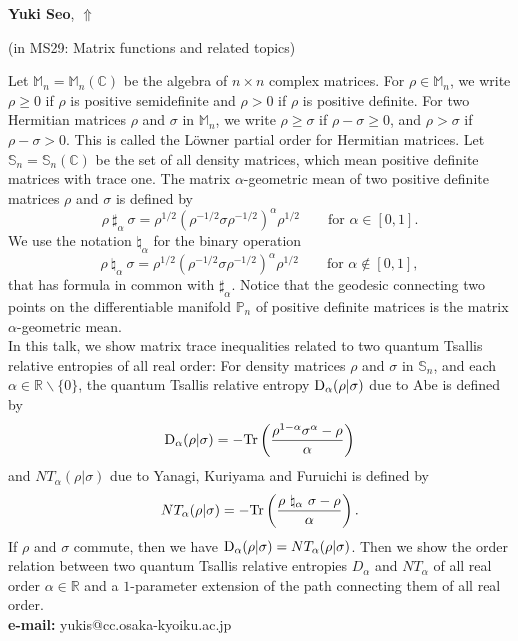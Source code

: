 \documentclass[ILAS2025-program.tex]{subfiles}
\begin{document}
\hypertarget{down0157}{}\begin{ilasabstract}
    
\textbf{Yuki Seo},  \hfill \hyperlink{up0157}{$\Uparrow$}
    
    
(in {\color{mstitle}MS29: Matrix functions and related topics})
        
\mtskip
    Let ${\mathbb M}_n = {\mathbb M}_n({\mathbb C})$ be the algebra of $n\times n$ complex matrices. For $\rho \in {\mathbb M}_n$, we write $\rho \geq 0$ if $\rho$ is positive semidefinite and $\rho >0$ if $\rho$ is positive definite. For two Hermitian matrices $\rho$ and $\sigma$ in ${\mathbb M}_n$, we write $\rho \geq \sigma$ if $\rho - \sigma \geq 0$, and $\rho > \sigma$ if $\rho - \sigma >0$. This is called the L\"{o}wner partial order for Hermitian matrices. Let ${\mathbb S}_n = {\mathbb S}_n({\mathbb C})$ be the set of all density matrices, which mean  positive definite matrices with trace one. The matrix $\alpha$-geometric mean of two positive definite matrices $\rho$ and $\sigma$ is defined by
\[
\rho\ \sharp_{\alpha}\ \sigma = \rho^{1/2}(\rho^{-1/2}\sigma \rho^{-1/2})^{\alpha}\rho^{1/2}\qquad \text{for $\alpha \in [0,1]$}.
\]
We use the notation $\natural_{\alpha}$ for the binary operation
\[
\rho\ \natural_{\alpha}\ \sigma = \rho^{1/2}(\rho^{-1/2}\sigma \rho^{-1/2})^{\alpha}\rho^{1/2}\qquad \text{for $\alpha \not\in [0,1]$},
\]
that has formula in common with $\sharp_{\alpha}$. Notice that the geodesic connecting two points on the differentiable manifold ${\mathbb P}_n$ of positive definite matrices is the matrix $\alpha$-geometric mean.\\
\quad In this talk, we show matrix trace inequalities related to two quantum Tsallis relative entropies of all real order: For density matrices $\rho$ and $\sigma$ in ${\mathbb S}_n$, and each $\alpha \in {\mathbb R}\backslash \{0\}$, the quantum Tsallis relative entropy ${\rm D}_{\alpha}(\rho|\sigma)$ due to Abe is defined by 
\[
{\rm D}_{\alpha}(\rho|\sigma)=-{\rm Tr}\left(\frac{\rho^{1-\alpha}\sigma^{\alpha}-\rho}{\alpha}\right)
\]
and $NT_{\alpha}(\rho | \sigma)$ due to Yanagi, Kuriyama and Furuichi is defined by 
\[
NT_{\alpha}(\rho|\sigma)=-{\rm Tr}\left(\frac{\rho\ \natural_{\alpha}\ \sigma-\rho}{\alpha}\right).
\]
If $\rho$ and $\sigma$ commute, then we have ${\rm D}_{\alpha}(\rho|\sigma)=NT_{\alpha}(\rho|\sigma)$. Then we show the order relation between two quantum Tsallis relative entropies $D_{\alpha}$ and $NT_{\alpha}$ of all real order $\alpha \in {\mathbb R}$ and a $1$-parameter extension of the path connecting them of all real order.\\
{\bf e-mail:} yukis@cc.osaka-kyoiku.ac.jp
\end{ilasabstract}
    
\end{document}

